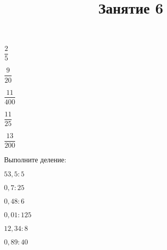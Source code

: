 \begin{class}[number=5]
\begin{listofex}[resume]
\begin{enumcols}[itemcolumns=6]
			\item \( \dfrac{2}{5} \)
			\item \( \dfrac{9}{20} \)
			\item \( \dfrac{11}{400} \)
			\item \( \dfrac{11}{25} \)
			\item \( \dfrac{13}{200} \)
		\end{enumcols}
		\item Выполните деление:
		\begin{enumcols}[itemcolumns=6]
			\item \( 53,5:5 \)
			\item \( 0,7:25 \)
			\item \( 0,48:6 \)
			\item \( 0,01:125 \)
			\item \( 12,34:8 \)
			\item \( 0,89:40 \)
		\end{enumcols}
	\end{listofex}
\end{class}
\title{Занятие 6}
